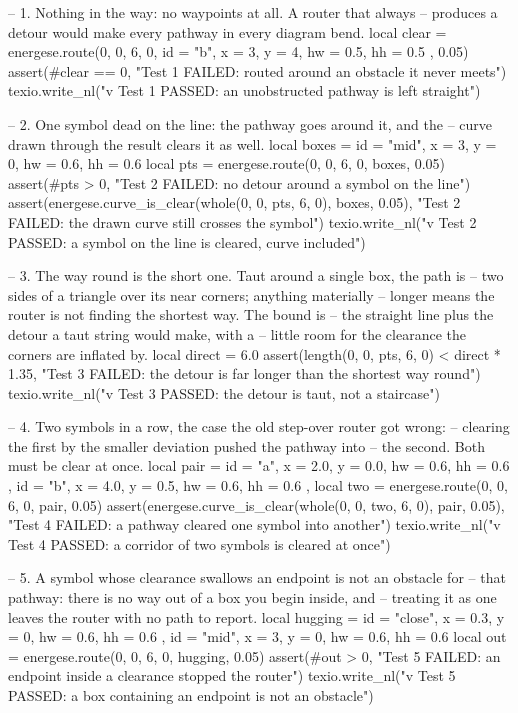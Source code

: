 \documentclass{article}
\begin{document}
\begin{luacode*}
    -- 1. Nothing in the way: no waypoints at all. A router that always
    --    produces a detour would make every pathway in every diagram bend.
    local clear = energese.route(0, 0, 6, 0, { { id = "b", x = 3, y = 4, hw = 0.5, hh = 0.5 } }, 0.05)
    assert(#clear == 0, "Test 1 FAILED: routed around an obstacle it never meets")
    texio.write_nl("v Test 1 PASSED: an unobstructed pathway is left straight")

    -- 2. One symbol dead on the line: the pathway goes around it, and the
    --    curve drawn through the result clears it as well.
    local boxes = { { id = "mid", x = 3, y = 0, hw = 0.6, hh = 0.6 } }
    local pts = energese.route(0, 0, 6, 0, boxes, 0.05)
    assert(#pts > 0, "Test 2 FAILED: no detour around a symbol on the line")
    assert(energese.curve_is_clear(whole(0, 0, pts, 6, 0), boxes, 0.05),
           "Test 2 FAILED: the drawn curve still crosses the symbol")
    texio.write_nl("v Test 2 PASSED: a symbol on the line is cleared, curve included")

    -- 3. The way round is the short one. Taut around a single box, the path is
    --    two sides of a triangle over its near corners; anything materially
    --    longer means the router is not finding the shortest way. The bound is
    --    the straight line plus the detour a taut string would make, with a
    --    little room for the clearance the corners are inflated by.
    local direct = 6.0
    assert(length(0, 0, pts, 6, 0) < direct * 1.35,
           "Test 3 FAILED: the detour is far longer than the shortest way round")
    texio.write_nl("v Test 3 PASSED: the detour is taut, not a staircase")

    -- 4. Two symbols in a row, the case the old step-over router got wrong:
    --    clearing the first by the smaller deviation pushed the pathway into
    --    the second. Both must be clear at once.
    local pair = {
        { id = "a", x = 2.0, y = 0.0, hw = 0.6, hh = 0.6 },
        { id = "b", x = 4.0, y = 0.5, hw = 0.6, hh = 0.6 },
    }
    local two = energese.route(0, 0, 6, 0, pair, 0.05)
    assert(energese.curve_is_clear(whole(0, 0, two, 6, 0), pair, 0.05),
           "Test 4 FAILED: a pathway cleared one symbol into another")
    texio.write_nl("v Test 4 PASSED: a corridor of two symbols is cleared at once")

    -- 5. A symbol whose clearance swallows an endpoint is not an obstacle for
    --    that pathway: there is no way out of a box you begin inside, and
    --    treating it as one leaves the router with no path to report.
    local hugging = { { id = "close", x = 0.3, y = 0, hw = 0.6, hh = 0.6 },
                      { id = "mid", x = 3, y = 0, hw = 0.6, hh = 0.6 } }
    local out = energese.route(0, 0, 6, 0, hugging, 0.05)
    assert(#out > 0, "Test 5 FAILED: an endpoint inside a clearance stopped the router")
    texio.write_nl("v Test 5 PASSED: a box containing an endpoint is not an obstacle")


\end{luacode*}
\end{document}
